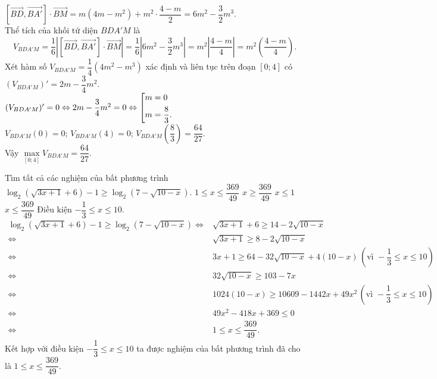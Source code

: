 \begin{ex}
{  $\left[ \vec{BD}, \vec{BA'} \right] \cdot \vec{BM} = m(4m-m^2) + m^2 \cdot \dfrac{4-m}{2} = 6m^2 - \dfrac{3}{2}m^3$.\\
  Thể tích của khối tứ diện $BDA'M$ là
  $$V_{BDA'M} = \dfrac{1}{6} \left| \left[ \vec{BD}, \vec{BA'} \right] \cdot \vec{BM} \right| = \dfrac{1}{6} \left| 6m^2 - \dfrac{3}{2}m^3 \right| = m^2 \left| \dfrac{4 - m}{4} \right| = m^2 \left( \dfrac{4-m}{4} \right).$$
  Xét hàm số $V_{BDA'M} = \dfrac{1}{4}(4m^2 - m^3)$ xác định và liên tục trên đoạn $[0;4]$ có
  $(V_{BDA'M})' = 2m - \dfrac{3}{4}m^2$.\\
  $(V_{BDA'M})' = 0 \Leftrightarrow 2m - \dfrac{3}{4}m^2 = 0 \Leftrightarrow \left[\begin{aligned}& m = 0 \\& m = \dfrac{8}{3}.\end{aligned}\right.$\\
  $V_{BDA'M} (0) = 0$; $V_{BDA'M} (4) = 0$; $V_{BDA'M} \left( \dfrac{8}{3} \right) = \dfrac{64}{27}$.\\
  Vậy $\max\limits_{[0;4]} V_{BDA'M} = \dfrac{64}{27}$.
  }
\end{ex}


\begin{ex}%
Tìm tất cả các nghiệm của bất phương trình $\log_2 \left( \sqrt{3x + 1} + 6 \right) - 1 \geq \log_2 \left( 7 - \sqrt{10 - x} \right)$.
 \choice
  {\True $1 \leq x \leq \dfrac{369}{49}$}
  {$x \geq \dfrac{369}{49}$}
  {$x \leq 1$}
  {$x \leq \dfrac{369}{49}$}
 \loigiai
  {
  Điều kiện $-\dfrac{1}{3} \leq x \leq 10$.
  \begin{align*}
   				 \log_2 \left( \sqrt{3x + 1} + 6 \right) - 1 \geq \log_2 \left( 7 - \sqrt{10 - x} \right)
   \Leftrightarrow & \sqrt{3x + 1} + 6 \geq 14 - 2 \sqrt{10 - x} \\
   \Leftrightarrow & \sqrt{3x + 1} \geq 8 - 2 \sqrt{10 - x} \\
   \Leftrightarrow & 3x + 1 \geq 64 - 32 \sqrt{10 - x} + 4(10 - x) \, \left( \text{vì } -\dfrac{1}{3} \leq x \leq 10 \right) \\
   \Leftrightarrow & 32 \sqrt{10 - x} \geq 103 - 7x \\
   \Leftrightarrow & 1024(10 - x) \geq 10609 - 1442x + 49x^2 \, \left( \text{vì } -\dfrac{1}{3} \leq x \leq 10 \right) \\
   \Leftrightarrow & 49x^2 - 418x + 369 \leq 0 \\
   \Leftrightarrow & 1 \leq x \leq \dfrac{369}{49}.
  \end{align*}
  Kết hợp với điều kiện $-\dfrac{1}{3} \leq x \leq 10$ ta được nghiệm của bất phương trình đã cho là $1 \leq x \leq \dfrac{369}{49}$.
  }
\end{ex}


